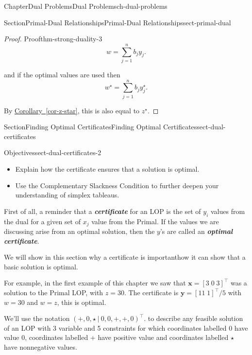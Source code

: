 \documentclass[oneside,10pt,]{book}
\newcommand{\xreffont}{\relax}
\newcommand{\alert}[1]{\textbf{\textit{#1}}}
\numberwithin{equation}{section}
\begin{document}
\begin{chapterptx}{Chapter}{Dual Problems}{}{Dual Problems}{}{}{ch-dual-problems}
\begin{sectionptx}{Section}{Primal-Dual Relationships}{}{Primal-Dual Relationships}{}{}{sect-primal-dual}
\begin{proof}{Proof}{}{thm-strong-duality-3}
\begin{equation*}
w = \sum_{j=1}^n b_j y_j.
\end{equation*}
%
\par
and if the optimal values are used then%
\begin{equation*}
w^{\star} = \sum_{j=1}^n b_j y_j^{\star}.
\end{equation*}
%
\par
By \hyperref[cor-z-star]{Corollary~{\xreffont\ref{cor-z-star}}}, this is also equal to \(z^{\star}\).%
\end{proof}
\end{sectionptx}
%
%
\typeout{************************************************}
\typeout{************************************************}
%
\begin{sectionptx}{Section}{Finding Optimal Certificates}{}{Finding Optimal Certificates}{}{}{sect-dual-certificates}
\begin{objectives}{Objectives}{sect-dual-certificates-2}
%
\begin{itemize}[label=\textbullet]
\item{}Explain how the certificate ensures that a solution is optimal.%
\item{}Use the Complementary Slackness Condition to further deepen your understanding of simplex tableaus.%
\end{itemize}
\end{objectives}
First of all, a reminder that a \alert{certificate} for an LOP is the set of \(y_{i}\) values from the dual for a given set of \(x_{j}\) value from the Primal. If the values we are discussing arise from an optimal solution, then the \(y\)'s are called an \alert{optimal certificate}.%
\par
We will show in this section why a certificate is important\textemdash{}how it can show that a basic solution is optimal.%
\par
For example, in the first example of this chapter we saw that \(\boldsymbol{x}=[3\; 0\; 3]^{\intercal}\) was a solution to the Primal LOP, with \(z=30\). The certificate is \(\boldsymbol{y}=[11 \; 1]^{\intercal}/5\) with \(w=30\) and \(w=z\), this is optimal.%
\par
We'll use the notation \((+,0,\star~|~0,0,+,+,0)^{\intercal}\). to describe any feasible solution of an LOP with 3 variable and 5 constraints for which coordinates labelled 0 have value 0, coordinates labelled + have positive value and coordinates labelled \(\star\) have nonnegative values.%

\end{sectionptx}
\end{chapterptx}
\end{document}
